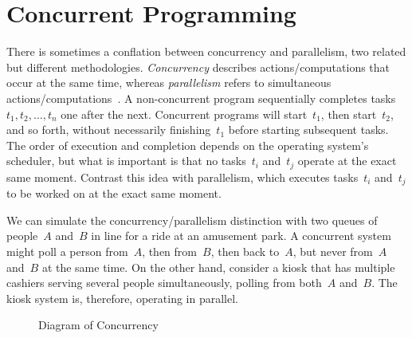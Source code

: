 \section{Concurrent Programming}

There is sometimes a conflation between concurrency and parallelism, two related but different methodologies. 
\emph{Concurrency} describes actions/computations that occur at the same time, whereas \emph{parallelism} refers to simultaneous actions/computations~. 
A non-concurrent program sequentially completes tasks~$t_1, t_2, \ldots, t_n$ one after the next. 
Concurrent programs will start~$t_1$, then start~$t_2$, and so forth, without necessarily finishing~$t_1$ before starting subsequent tasks. 
The order of execution and completion depends on the operating system's scheduler, but what is important is that no tasks~$t_i$ and~$t_j$ operate at the exact same moment. 
Contrast this idea with parallelism, which executes tasks~$t_i$ and~$t_j$ to be worked on at the exact same moment. 

We can simulate the concurrency/parallelism distinction with two queues of people~$A$ and~$B$ in line for a ride at an amusement park. 
A concurrent system might poll a person from~$A$, then from~$B$, then back to~$A$, but never from~$A$ and~$B$ at the same time. 
On the other hand, consider a kiosk that has multiple cashiers serving several people simultaneously, polling from both~$A$ and~$B$. 
The kiosk system is, therefore, operating in parallel. 

\begin{figure}[ht]
\centering
{}
\caption{Diagram of Concurrency}
\end{figure}

